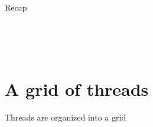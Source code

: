 \documentclass[11pt,t]{beamer}
\begin{document}
\begin{frame}{Recap} 

    \vspace{-0.5cm}

    \begin{columns}[t] %
    \begin{figure}
    \centering
    \resizebox{0.95\columnwidth}{!}{}
    \end{figure}
    
    \begin{figure}
    \centering
    \resizebox{0.95\columnwidth}{!}{}
    \end{figure}
    \end{columns}
    
    \begin{columns}[t] %
    \begin{figure}
    \centering
    \resizebox{0.95\columnwidth}{!}{}
    \end{figure}
    
    \begin{figure}
    \centering
    \resizebox{0.95\columnwidth}{!}{}
    \end{figure}
    \end{columns}

\end{frame}



\section{A grid of threads}

\begin{frame}{Threads are organized into a grid} 

    \begin{figure}[t]
        \centering
        \begin{center}               
            \resizebox{0.98\columnwidth}{!}{}
        \end{center}
    \end{figure}
    
\end{frame}
\end{document}
